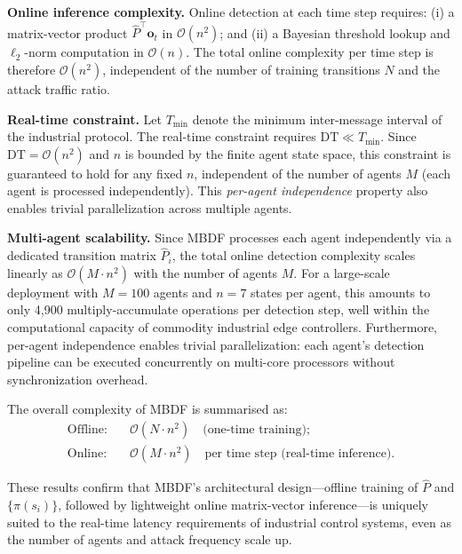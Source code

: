 \documentclass[manuscript,screen,review]{acmart}
\begin{document}
\textbf{Online inference complexity.}
Online detection at each time step requires:
(i) a matrix-vector product
$\hat{P}^{\top}\mathbf{o}_t$ in $\mathcal{O}(n^2)$;
and (ii) a Bayesian threshold lookup and $\ell_2$-norm
computation in $\mathcal{O}(n)$. The total online
complexity per time step is therefore $\mathcal{O}(n^2)$,
independent of the number of training transitions $N$
and the attack traffic ratio.

\textbf{Real-time constraint.}
Let $T_{\min}$ denote the minimum inter-message interval
of the industrial protocol. The real-time constraint
requires $\mathrm{DT} \ll T_{\min}$. Since
$\mathrm{DT} = \mathcal{O}(n^2)$ and $n$ is bounded by
the finite agent state space, this constraint is
guaranteed to hold for any fixed $n$, independent of the
number of agents $M$ (each agent is processed
independently). This \textit{per-agent independence}
property also enables trivial parallelization across
multiple agents.

\textbf{Multi-agent scalability.}
Since MBDF processes each agent independently via a
dedicated transition matrix $\hat{P}_i$, the total online
detection complexity scales linearly as
$\mathcal{O}(M \cdot n^2)$ with the number of agents
$M$. For a large-scale deployment with $M = 100$ agents
and $n = 7$ states per agent, this amounts to only
4{,}900 multiply-accumulate operations per detection
step, well within the computational capacity of commodity
industrial edge controllers. Furthermore, per-agent
independence enables trivial parallelization: each
agent's detection pipeline can be executed concurrently
on multi-core processors without synchronization
overhead.

The overall complexity of MBDF is summarised as:
\begin{equation}
\begin{aligned}
\text{Offline:} \quad &
  \mathcal{O}(N \cdot n^2)
  \quad \text{(one-time training)}; \\
\text{Online:}  \quad &
  \mathcal{O}(M \cdot n^2)
  \quad \text{per time step (real-time inference).}
\end{aligned}
\label{eq:complexity}
\end{equation}

These results confirm that MBDF's architectural
design---offline training of $\hat{P}$ and
$\{\pi(s_i)\}$, followed by lightweight online
matrix-vector inference---is uniquely suited to the
real-time latency requirements of industrial control
systems, even as the number of agents and attack
frequency scale up.
\end{document}
